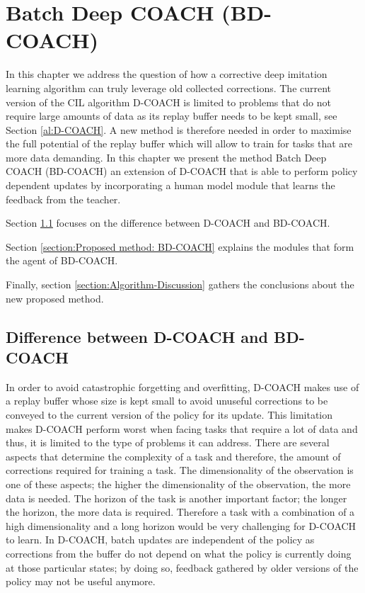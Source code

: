 \chapter{Batch Deep COACH (BD-COACH)}
\label{chapter:Proposed Method}

In this chapter we address the question of how a corrective deep imitation learning algorithm can truly leverage old collected corrections. The current version of the CIL algorithm D-COACH is limited to problems that do not require large amounts of data as its replay buffer needs to be kept small, see Section \ref{al:D-COACH}. A new method is therefore needed in order to maximise the full potential of the replay buffer which will allow to train for tasks that are more data demanding. In this chapter we present the method Batch Deep COACH (BD-COACH) an extension of D-COACH that is able to perform policy dependent updates by incorporating a  human model module that learns the feedback from the teacher.

Section \ref{section:Difference between D-COACH and BD-COACH} focuses on the difference between D-COACH and BD-COACH.

Section \ref{section:Proposed method: BD-COACH} explains the modules that form the agent of BD-COACH.


Finally, section \ref{section:Algorithm-Discussion} gathers the conclusions about the new proposed method.  


\section{Difference between D-COACH and BD-COACH}
\label{section:Difference between D-COACH and BD-COACH}

In order to avoid catastrophic forgetting and overfitting, D-COACH makes use of a replay buffer whose size is kept small to avoid unuseful corrections to be conveyed to the current version of the policy for its update. This limitation makes D-COACH perform worst when facing tasks that require a lot of data and thus, it is limited to the type of problems it can address. There are several aspects that determine the complexity of a task and therefore, the amount of corrections required for training a task. The dimensionality of the observation is one of these aspects; the higher the dimensionality of the observation, the more data is needed. The horizon of the task is another important factor; the longer the horizon, the more data is required. Therefore a task with a combination of a high dimensionality and a long horizon would be very challenging for D-COACH to learn. In D-COACH, batch updates are independent of the policy as corrections from the buffer do not depend on what the policy is currently doing at those particular states; by doing so, feedback gathered by older versions of the policy may not be useful anymore.



